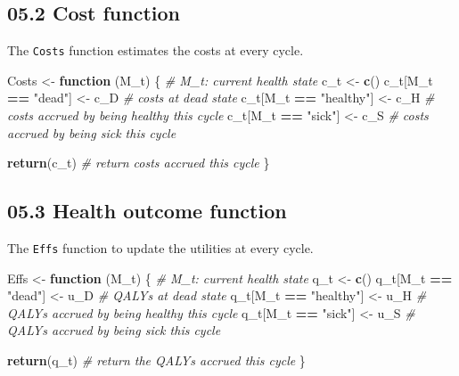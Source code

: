 \documentclass[
]{article}
\newenvironment{Shaded}{\begin{snugshade}}{\end{snugshade}}
\newcommand{\CommentTok}[1]{\textcolor[rgb]{0.56,0.35,0.01}{\textit{#1}}}
\newcommand{\ControlFlowTok}[1]{\textcolor[rgb]{0.13,0.29,0.53}{\textbf{#1}}}
\newcommand{\KeywordTok}[1]{\textcolor[rgb]{0.13,0.29,0.53}{\textbf{#1}}}
\newcommand{\NormalTok}[1]{#1}
\newcommand{\OperatorTok}[1]{\textcolor[rgb]{0.81,0.36,0.00}{\textbf{#1}}}
\newcommand{\StringTok}[1]{\textcolor[rgb]{0.31,0.60,0.02}{#1}}
\begin{document}
\hypertarget{cost-function}{%
\subsection{05.2 Cost function}\label{cost-function}}

The \texttt{Costs} function estimates the costs at every cycle.

\begin{Shaded}
\begin{Highlighting}[]
\NormalTok{Costs <-}\StringTok{ }\ControlFlowTok{function}\NormalTok{ (M_t) \{}
  \CommentTok{# M_t: current health state}
\NormalTok{  c_t <-}\StringTok{ }\KeywordTok{c}\NormalTok{()}
\NormalTok{  c_t[M_t }\OperatorTok{==}\StringTok{ "dead"}\NormalTok{]    <-}\StringTok{ }\NormalTok{c_D     }\CommentTok{# costs at dead state}
\NormalTok{  c_t[M_t }\OperatorTok{==}\StringTok{ "healthy"}\NormalTok{] <-}\StringTok{ }\NormalTok{c_H     }\CommentTok{# costs accrued by being healthy this cycle}
\NormalTok{  c_t[M_t }\OperatorTok{==}\StringTok{ "sick"}\NormalTok{]    <-}\StringTok{ }\NormalTok{c_S     }\CommentTok{# costs accrued by being sick this cycle}
  
  \KeywordTok{return}\NormalTok{(c_t)  }\CommentTok{# return costs accrued this cycle}
\NormalTok{\}}
\end{Highlighting}
\end{Shaded}

\hypertarget{health-outcome-function}{%
\subsection{05.3 Health outcome
function}\label{health-outcome-function}}

The \texttt{Effs} function to update the utilities at every cycle.

\begin{Shaded}
\begin{Highlighting}[]
\NormalTok{Effs <-}\StringTok{ }\ControlFlowTok{function}\NormalTok{ (M_t) \{}
  \CommentTok{# M_t: current health state}
\NormalTok{  q_t <-}\StringTok{ }\KeywordTok{c}\NormalTok{() }
\NormalTok{  q_t[M_t }\OperatorTok{==}\StringTok{ "dead"}\NormalTok{]    <-}\StringTok{ }\NormalTok{u_D     }\CommentTok{# QALYs at dead state}
\NormalTok{  q_t[M_t }\OperatorTok{==}\StringTok{ "healthy"}\NormalTok{] <-}\StringTok{ }\NormalTok{u_H     }\CommentTok{# QALYs accrued by being healthy this cycle}
\NormalTok{  q_t[M_t }\OperatorTok{==}\StringTok{ "sick"}\NormalTok{]    <-}\StringTok{ }\NormalTok{u_S     }\CommentTok{# QALYs accrued by being sick this cycle}
  
  \KeywordTok{return}\NormalTok{(q_t)  }\CommentTok{# return the QALYs accrued this cycle}
\NormalTok{\}}
\end{Highlighting}
\end{Shaded}
\end{document}
